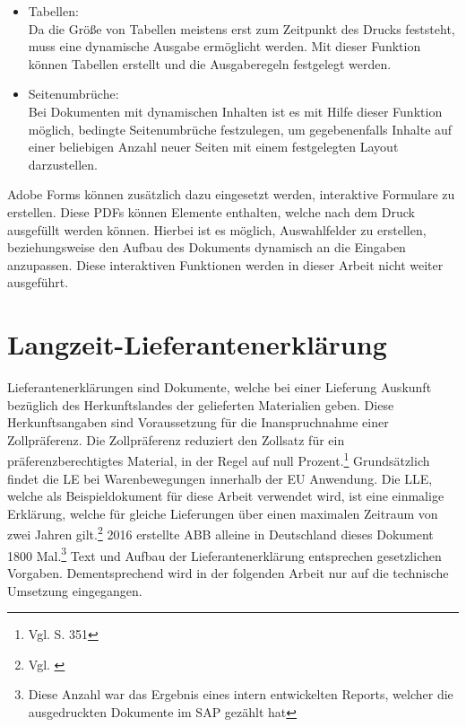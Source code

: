 \begin{itemize}
	\item Tabellen: \\
		Da die Größe von Tabellen meistens erst zum Zeitpunkt des Drucks feststeht, muss eine dynamische Ausgabe ermöglicht werden. Mit dieser Funktion können Tabellen erstellt und die Ausgaberegeln festgelegt werden.
	\item Seitenumbrüche: \\
		Bei Dokumenten mit dynamischen Inhalten ist es mit Hilfe dieser Funktion möglich, bedingte Seitenumbrüche festzulegen, um gegebenenfalls Inhalte auf einer beliebigen Anzahl neuer Seiten mit einem festgelegten Layout darzustellen.
\end{itemize} 
       
Adobe Forms können zusätzlich dazu eingesetzt werden, interaktive Formulare zu erstellen. Diese \ac{PDF}s können Elemente enthalten, welche nach dem Druck ausgefüllt werden können. Hierbei ist es möglich, Auswahlfelder zu erstellen, beziehungsweise den Aufbau des Dokuments dynamisch an die Eingaben anzupassen. Diese interaktiven Funktionen werden in dieser Arbeit nicht weiter ausgeführt.
\FloatBarrier
\section{Langzeit-Lieferantenerklärung}
\label{LLE}

 Lieferantenerklärungen sind Dokumente, welche bei einer Lieferung Auskunft bezüglich des Herkunftslandes der gelieferten Materialien geben. Diese Herkunftsangaben sind Voraussetzung für die Inanspruchnahme einer Zollpräferenz. Die Zollpräferenz reduziert den Zollsatz für ein präferenzberechtigtes Material, in der Regel auf null Prozent.\footnote{Vgl. \cite{Schnellenbach.2015} S. 351} Grundsätzlich findet die \ac{LE} bei Warenbewegungen innerhalb der \ac{EU} Anwendung. Die \ac{LLE}, welche als Beispieldokument für diese Arbeit verwendet wird, ist eine einmalige Erklärung, welche für gleiche Lieferungen über einen maximalen Zeitraum von zwei Jahren gilt.\footnote{Vgl. \cite{ZOLL.2017}} 2016 erstellte \ac{ABB} alleine in Deutschland dieses Dokument 1800 Mal.\footnote{Diese Anzahl war das Ergebnis eines intern entwickelten Reports, welcher die ausgedruckten Dokumente im SAP gezählt hat} Text und Aufbau der Lieferantenerklärung entsprechen gesetzlichen Vorgaben. Dementsprechend wird in der folgenden Arbeit nur auf die technische Umsetzung eingegangen.
